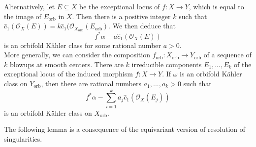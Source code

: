 \documentclass[12pt]{amsart}
\newcommand{\<}{\leq}
\def\mcO{\mathcal{O}}
\theoremstyle{remark}
\theoremstyle{definition}
\theoremstyle{definition}
\numberwithin{equation}{section}
\theoremstyle{definition}
\theoremstyle{definition}
\def\orb{\mathrm{orb}}
\begin{document}
Alternatively, let $E\subseteq X$ be the  exceptional locus of $f\colon X\to Y$, which is equal to the image of $E_{\orb}$ in $X$. 
Then there is a positive integer $k$ such that $\hat{c}_1(\mcO_X (E) ) = k \hat{c}_1(\mcO_{X_{\orb}}(E_{\orb})$. 
We then  deduce that 
\[ 
f^*\alpha - a \hat{c}_1(\mcO_{X}(E))
\]
is an orbifold K\"ahler class for some rational number $a>0$.  \\








More generally, we can consider  the composition  $f_{\orb} \colon X_{\orb}   \to Y_{\orb}$  of a sequence of $k$ blowups at smooth centers.   
There are $k$ irreducible components $E_1,...,E_k$ of the exceptional locus of the induced morphism $f\colon X\to Y$.   
If $\omega$ is an orbifold K\"ahler class on $Y_{\orb}$, then there are rational numbers $a_1,...,a_k>0$ such that 
\begin{equation}\label{eqn:orbifold-kahler-class} 
f^*\alpha - \sum_{i=1}^k a_j \hat{c}_1(\mcO_{X}(E_{j}))
\end{equation}
is an orbifold K\"ahler class on $X_\orb$. 


The following lemma is a consequence of the equivariant version of resolution of singularities. 
\end{document}
